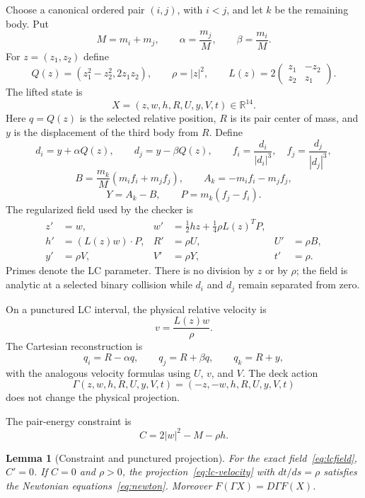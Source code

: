 \documentclass[11pt]{article}
\newtheorem{lemma}[theorem]{Lemma}
\newcommand{\R}{\mathbb{R}}
\begin{document}
Choose a canonical ordered pair $(i,j)$, with $i<j$, and let $k$ be the
remaining body.  Put
\[
 M=m_i+m_j,\qquad \alpha=\frac{m_j}{M},\qquad
 \beta=\frac{m_i}{M}.
\]
For $z=(z_1,z_2)$ define
\[
 Q(z)=(z_1^2-z_2^2,2z_1z_2),\qquad
 \rho=|z|^2,\qquad
 L(z)=2\begin{pmatrix}z_1&-z_2\\z_2&z_1\end{pmatrix}.
\]
The lifted state is
\[
 X=(z,w,h,R,U,y,V,t)\in\R^{14}.
\]
Here $q=Q(z)$ is the selected relative position, $R$ is its pair center of
mass, and $y$ is the displacement of the third body from $R$.  Define
\[
 d_i=y+\alpha Q(z),\qquad d_j=y-\beta Q(z),
 \qquad f_i=\frac{d_i}{|d_i|^3},\quad
 f_j=\frac{d_j}{|d_j|^3},
\]
\[
 B=\frac{m_k}{M}(m_i f_i+m_j f_j),\qquad
 A_k=-m_i f_i-m_j f_j,
\]
\[
 Y=A_k-B,\qquad P=m_k(f_j-f_i).
\]
The regularized field used by the checker is
\begin{align}
 z'&=w,&
 w'&=\tfrac12hz+\tfrac14\rho L(z)^TP,\nonumber\\
 h'&=(L(z)w)\mathbin{\cdot}P,&
 R'&=\rho U,& U'&=\rho B,\label{eq:lcfield}\\
 y'&=\rho V,& V'&=\rho Y,& t'&=\rho.\nonumber
\end{align}
Primes denote the LC parameter.  There is no division by $z$ or by $\rho$;
the field is analytic at a selected binary collision while $d_i$ and $d_j$
remain separated from zero.

On a punctured LC interval, the physical relative velocity is
\begin{equation}
 v=\frac{L(z)w}{\rho}.
 \label{eq:lc-velocity}
\end{equation}
The Cartesian reconstruction is
\[
 q_i=R-\alpha q,\qquad q_j=R+\beta q,\qquad q_k=R+y,
\]
with the analogous velocity formulas using $U$, $v$, and $V$.  The deck
action
\begin{equation}
 \Gamma(z,w,h,R,U,y,V,t)=(-z,-w,h,R,U,y,V,t)
 \label{eq:deck}
\end{equation}
does not change the physical projection.

The pair-energy constraint is
\begin{equation}
 C=2|w|^2-M-\rho h.
 \label{eq:constraint}
\end{equation}

\begin{lemma}[Constraint and punctured projection]
\label{lem:projection}
For the exact field~\eqref{eq:lcfield}, $C'=0$.  If $C=0$ and $\rho>0$,
the projection~\eqref{eq:lc-velocity} with $dt/ds=\rho$ satisfies the
Newtonian equations~\eqref{eq:newton}.  Moreover
$F(\Gamma X)=D\Gamma F(X)$.
\end{lemma}
\end{document}
